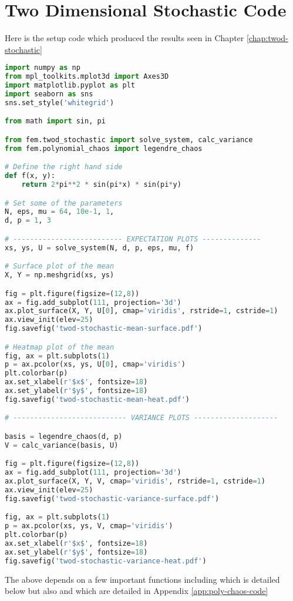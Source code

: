 \chapter{Two Dimensional Stochastic Code}\label{app:twod-stochastic-code}

Here is the setup code which produced the results seen in Chapter
\ref{chap:twod-stochastic}

\begin{lstlisting}[language=Python,
                   caption={Setup code for the problems detailed in
                   Chapter \ref{chap:twod-stochastic}},
                   label={code:twod-stochastic-setup}]
import numpy as np
from mpl_toolkits.mplot3d import Axes3D
import matplotlib.pyplot as plt
import seaborn as sns
sns.set_style('whitegrid')

from math import sin, pi

from fem.twod_stochastic import solve_system, calc_variance
from fem.polynomial_chaos import legendre_chaos

# Define the right hand side
def f(x, y):
    return 2*pi**2 * sin(pi*x) * sin(pi*y)

# Set some of the parameters
N, eps, mu = 64, 10e-1, 1,
d, p = 1, 3

# -------------------------- EXPECTATION PLOTS --------------
xs, ys, U = solve_system(N, d, p, eps, mu, f)

# Surface plot of the mean
X, Y = np.meshgrid(xs, ys)

fig = plt.figure(figsize=(12,8))
ax = fig.add_subplot(111, projection='3d')
ax.plot_surface(X, Y, U[0], cmap='viridis', rstride=1, cstride=1)
ax.view_init(elev=25)
fig.savefig('twod-stochastic-mean-surface.pdf')

# Heatmap plot of the mean
fig, ax = plt.subplots(1)
p = ax.pcolor(xs, ys, U[0], cmap='viridis')
plt.colorbar(p)
ax.set_xlabel(r'$x$', fontsize=18)
ax.set_ylabel(r'$y$', fontsize=18)
fig.savefig('twod-stochastic-mean-heat.pdf')

# --------------------------- VARIANCE PLOTS --------------------

basis = legendre_chaos(d, p)
V = calc_variance(basis, U)

fig = plt.figure(figsize=(12,8))
ax = fig.add_subplot(111, projection='3d')
ax.plot_surface(X, Y, V, cmap='viridis', rstride=1, cstride=1)
ax.view_init(elev=25)
fig.savefig('twod-stochastic-variance-surface.pdf')

fig, ax = plt.subplots(1)
p = ax.pcolor(xs, ys, V, cmap='viridis')
plt.colorbar(p)
ax.set_xlabel(r'$x$', fontsize=18)
ax.set_ylabel(r'$y$', fontsize=18)
fig.savefig('twod-stochastic-variance-heat.pdf')
\end{lstlisting}

The above depends on a few important functions including 
which is detailed below but also  and
 which are detailed in Appendix \ref{app:poly-chaos-code}



